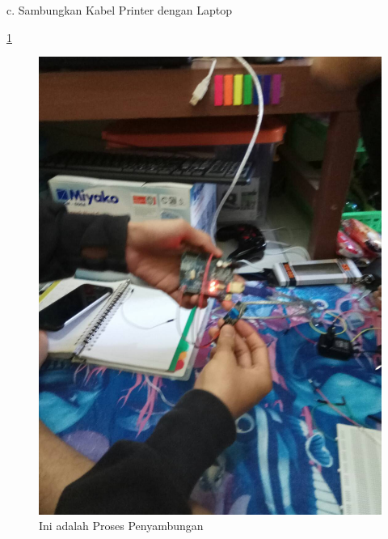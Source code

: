 \documentclass{article}
\begin{document}
 c. Sambungkan Kabel Printer dengan Laptop

  \ref{ar7}
  \begin{figure}[ht]
  \centerline{\includegraphics[width=1\textwidth]{../figures/ar7.jpg}}
  \caption{Ini adalah Proses Penyambungan}
  \label{ar7}
  \end{figure}
\end{document}
